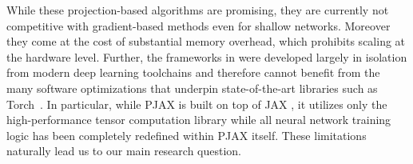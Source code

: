 While these projection-based algorithms are promising, they are currently not competitive with gradient-based methods even for shallow networks. Moreover they come at the cost of substantial memory overhead, which prohibits scaling at the hardware level. Further, the frameworks in \cite{elser2019learning,bergmeister2025projection} were developed largely in isolation from modern deep learning toolchains and therefore cannot benefit from the many software optimizations that underpin state-of-the-art libraries such as Torch~\cite{paszke2019pytorchimperativestylehighperformance}. In particular, while PJAX \cite{bergmeister2025projection} is built on top of JAX \cite{bradbury2018jax}, it utilizes only the high-performance tensor computation library while all neural network training logic has been completely redefined within PJAX itself. These limitations naturally lead us to our main research question.


